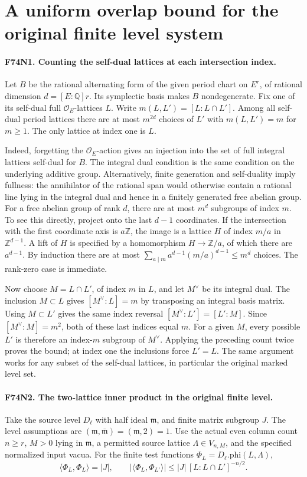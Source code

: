 \section{A uniform overlap bound for the original finite level system}

\paragraph{F74N1. Counting the self-dual lattices at each intersection index.}
Let $B$ be the rational alternating form of the given period chart
on $E^r$, of rational dimension $d=[E:\mathbb Q]r$. Its symplectic
basis makes $B$ nondegenerate. Fix one of its self-dual full
$\mathcal O_E$-lattices $L$. Write
$m(L,L')=[L:L\cap L']$. Among all self-dual period lattices there
are at most $m^{2d}$ choices of $L'$ with $m(L,L')=m$ for $m\ge1$.
The only lattice at index one is $L$.

Indeed, forgetting the $\mathcal O_E$-action gives an injection into
the set of full integral lattices self-dual for $B$. The integral
dual condition is the same condition on the underlying additive
group. Alternatively, finite generation and self-duality imply
fullness: the annihilator of the rational span would otherwise contain
a rational line lying in the integral dual and hence in a finitely
generated free abelian group. For a free abelian group of rank $d$,
there are at most $m^d$ subgroups of index $m$. To see this directly,
project onto the last $d-1$ coordinates. If the intersection with
the first coordinate axis is $a\mathbb Z$, the image is a lattice
$H$ of index $m/a$ in $\mathbb Z^{d-1}$. A lift of $H$ is
specified by a homomorphism $H\to\mathbb Z/a$, of which there
are $a^{d-1}$. By induction there are at most
$\sum_{a\mid m}a^{d-1}(m/a)^{d-1}\le m^d$ choices.
The rank-zero case is immediate.

Now choose $M=L\cap L'$, of index $m$ in $L$, and let $M^\vee$
be its integral dual. The inclusion $M\subset L$ gives
$[M^\vee:L]=m$ by transposing an integral basis matrix. Using
$M\subset L'$ gives the same index reversal
$[M^\vee:L']=[L':M]$. Since $[M^\vee:M]=m^2$, both of these
last indices equal $m$. For a given $M$, every possible $L'$ is
therefore an index-$m$ subgroup of $M^\vee$. Applying the preceding
count twice proves the bound; at index one the inclusions force
$L'=L$. The same argument works for any subset of the self-dual
lattices, in particular the original marked level set.

\paragraph{F74N2. The two-lattice inner product in the original finite level.}
Take the source level $D_\ell$ with half ideal $\mathfrak m$,
and finite matrix subgroup $J$. The level assumptions
are $(\mathfrak m,\bar{\mathfrak m})=(\mathfrak m,2)=1$.
Use the actual even column count $n\ge r$, $M>0$ lying in
$\mathfrak m$, a permitted source lattice $\Lambda\in V_{n,M}$,
and the specified normalized input vacua. For the finite test functions
$\Phi_L=D_\ell.\mathrm{phi}(L,\Lambda)$,
\[
 \langle\Phi_L,\Phi_L\rangle=|J|,\qquad
 |\langle\Phi_L,\Phi_{L'}\rangle|
       \le |J|\,[L:L\cap L']^{-n/2}.
\]

